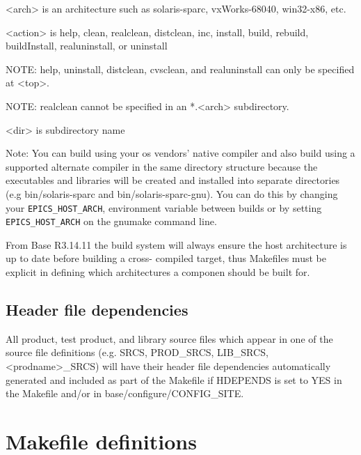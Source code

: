 \begin{description}\item \textless{}arch\textgreater{} is an architecture such as solaris-sparc, vxWorks-68040, win32-x86, etc.

\item \textless{}action\textgreater{} is help, clean, realclean, distclean, inc, install, build, rebuild, buildInstall, realuninstall, or uninstall

\item NOTE: help, uninstall, distclean, cvsclean, and realuninstall can only be specified at \textless{}top\textgreater{}.

\item NOTE: realclean cannot be specified in an *.\textless{}arch\textgreater{} subdirectory.

\item \textless{}dir\textgreater{} is subdirectory name

\end{description}Note: You can build using your os vendors' native compiler and also build using a supported alternate compiler in the 
same directory structure because the executables and libraries will be created and installed into separate directories (e.g 
bin/solaris-sparc and bin/solaris-sparc-gnu). You can do this by changing your \verb|EPICS_HOST_ARCH|, environment 
variable between builds or by setting \verb|EPICS_HOST_ARCH| on the gnumake command line.

From Base R3.14.11 the build system will always ensure the host architecture is up to date before building a cross-
compiled target, thus Makefiles must be explicit in defining which architectures a componen should be built for.

\subsection{Header file dependencies}

All product, test product, and library source files which appear in one of the source file definitions (e.g. SRCS, 
PROD\_SRCS, LIB\_SRCS, \textless{}prodname\textgreater{}\_SRCS) will have their header file dependencies automatically generated and 
included as part of the Makefile if HDEPENDS is set to YES in the Makefile and/or in base/configure/CONFIG\_SITE.

\section{Makefile definitions}

